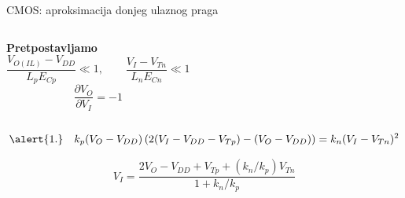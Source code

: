 \begin{frame}[label=09_2-s027]{CMOS: aproksimacija donjeg ulaznog praga}
\begin{columns}[T,onlytextwidth]\centering {}\textbf{Pretpostavljamo}
\[\frac{V_{O(IL)}-V_{DD}}{L_pE_{Cp}}\ll1,\qquad\frac{V_I-V_{Tn}}{L_nE_{Cn}}\ll1\]
\[\frac{\partial V_O}{\partial V_I}=-1\]
\end{columns}
\[\alert{1.}\quad k_p(V_O-V_{DD})\left(2(V_I-V_{DD}-V_{Tp})-(V_O-V_{DD})\right)=k_n(V_I-V_{Tn})^2\]

\[V_I=\frac{2V_O-V_{DD}+V_{Tp}+(k_n/k_p)V_{Tn}}{1+k_n/k_p}\]

\end{frame}
